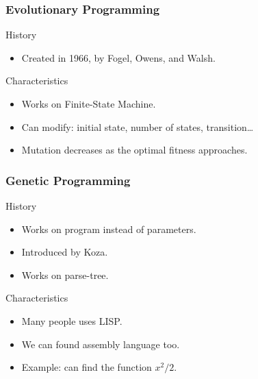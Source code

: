 \begin{frame}
  \frametitle{Evolutionary Programming}
  \begin{block}{History}
    \begin{itemize}
      \item Created in 1966, by Fogel, Owens, and Walsh\cite{fogel1966}.
    \end{itemize}
  \end{block}

  \begin{block}{Characteristics}
    \begin{itemize}
    \item Works on Finite-State Machine.
    \item Can modify: initial state, number of states, transition\dots
    \item Mutation decreases as the optimal fitness approaches.
    \end{itemize}
  \end{block}
\end{frame}


\begin{frame}
  \frametitle{Genetic Programming}
  \begin{block}{History}
    \begin{itemize}
    \item Works on program instead of parameters.
    \item Introduced by Koza\cite{Koza92}.
    \item Works on parse-tree.
    \end{itemize}
  \end{block}

  \begin{block}{Characteristics}
    \begin{itemize}
    \item Many people uses LISP.
    \item We can found assembly language too.
    \item Example: can find the function $x^2/2$.
    \end{itemize}
  \end{block}
\end{frame}


